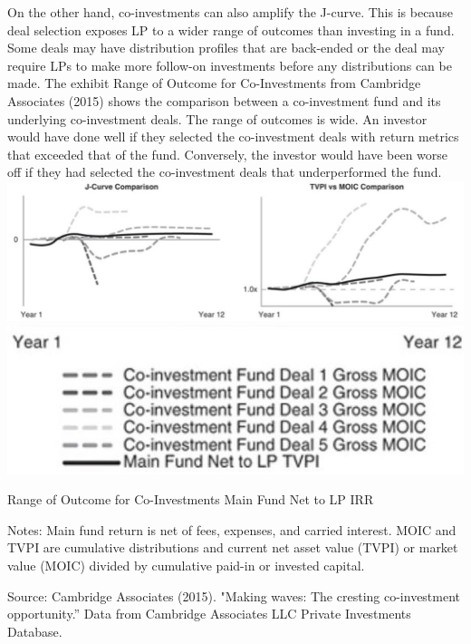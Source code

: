 \documentclass[11pt]{article}
\begin{document}
On the other hand, co-investments can also amplify the J-curve. This is because deal selection exposes LP to a wider range of outcomes than investing in a fund. Some deals may have distribution profiles that are back-ended or the deal may require LPs to make more follow-on investments before any distributions can be made. The exhibit Range of Outcome for Co-Investments from Cambridge Associates (2015) shows the comparison between a co-investment fund and its underlying co-investment deals. The range of outcomes is wide. An investor would have done well if they selected the co-investment deals with return metrics that exceeded that of the fund. Conversely, the investor would have been worse off if they had selected the co-investment deals that underperformed the fund.\\
\includegraphics[max width=\textwidth, center]{2024_04_10_6394ed7f28ddb869f41dg-3(1)}\\
\includegraphics[max width=\textwidth, center]{2024_04_10_6394ed7f28ddb869f41dg-3}

Range of Outcome for Co-Investments Main Fund Net to LP IRR

Notes: Main fund return is net of fees, expenses, and carried interest. MOIC and TVPI are cumulative distributions and current net asset value (TVPI) or market value (MOIC) divided by cumulative paid-in or invested capital.

Source: Cambridge Associates (2015). "Making waves: The cresting co-investment opportunity.” Data from Cambridge Associates LLC Private Investments Database.
\end{document}
